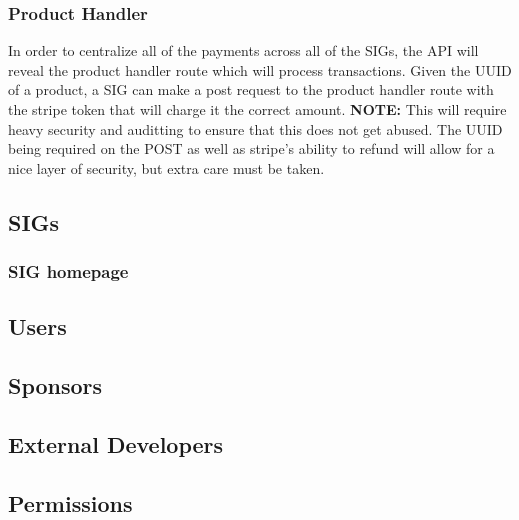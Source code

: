 \documentclass{article}
\begin{document}
\subsubsection{Product Handler}
In order to centralize all of the payments across all of the SIGs, the API will
reveal the product handler route which will process transactions. Given the UUID
of a product, a SIG can make a post request to the product handler route with the
stripe token that will charge it the correct amount. \textbf{NOTE:} This will
require heavy security and auditting to ensure that this does not get abused.
The UUID being required on the POST as well as stripe's ability to refund will 
allow for a nice layer of security, but extra care must be taken.

\subsection{SIGs}
\subsubsection{SIG homepage}
\subsection{Users}
\subsection{Sponsors}
\subsection{External Developers}
\subsection{Permissions}
\end{document}
